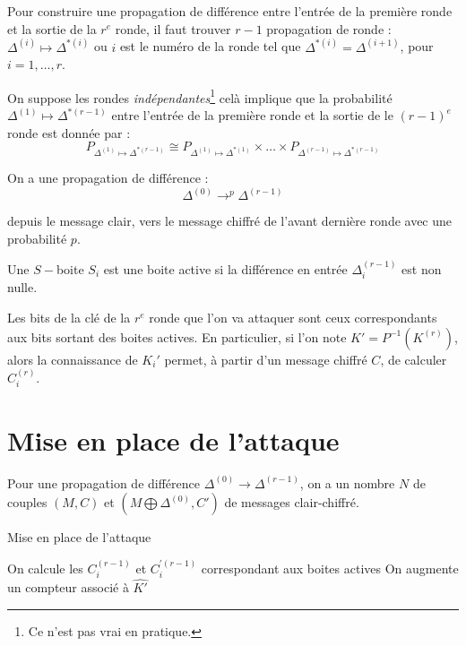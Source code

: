 \documentclass[a4paper, 10pt]{thesis}
\begin{document}
Pour construire une propagation de différence entre l'entrée de la première ronde et la sortie de la
$r^e$ ronde, il faut trouver $r-1$ propagation de ronde : $\Delta^{(i)} \mapsto \Delta^{*(i)}$ ou
$i$ est le numéro de la ronde tel que $\Delta^{*(i)} = \Delta^{(i+1)}$, pour $i = 1, \dots, r$.


On suppose les rondes \emph{indépendantes}\footnote{Ce n'est pas vrai en pratique.} celà implique
que la probabilité $\Delta^{(1)} \mapsto \Delta^{*(r-1)}$ entre l'entrée de la première ronde et la
sortie de le $(r - 1)^e$ ronde est donnée par : 
\begin{displaymath}
    P_{\Delta^{(1)} \mapsto \Delta^{*(r-1)}} \cong P_{\Delta^{(1)} \mapsto \Delta^{*(1)}} \times
    \dots \times P_{\Delta^{(r-1)} \mapsto \Delta^{*(r-1)}}
\end{displaymath}

On a une propagation de différence :
\begin{displaymath}
    \Delta^{(0)} \longrightarrow^{p} \Delta^{(r-1)}
\end{displaymath}

depuis le message clair, vers le message chiffré de l'avant dernière ronde avec une probabilité $p$.

\begin{df}
    Une $S-$boite $S_i$ est une boite active si la différence en entrée $\Delta_i^{(r-1)}$ est non
    nulle.
\end{df}

Les bits de la clé de la $r^e$ ronde que l'on va attaquer sont ceux correspondants aux bits sortant
des boites actives. En particulier, si l'on note $K' = P^{-1}(K^{(r)})$, alors la connaissance de
$K_i'$ permet, à partir d'un message chiffré $C$, de calculer $C_i^{(r)}$.

\section{Mise en place de l'attaque}

Pour une propagation de différence $\Delta^{(0)} \longrightarrow \Delta^{(r-1)}$, on a un nombre $N$
de couples $(M,C)$ et $(M \bigoplus \Delta^{(0)}, C')$ de messages clair-chiffré.

\begin{algorithm}
    \caption{Mise en place de l'attaque}
    \label{alg_att_diff}
    \begin{algorithmic}[1]
                \State On calcule les $C_i^{(r-1)}$ et $C_i^{'(r-1)}$ correspondant aux boites
                actives
                    \State On augmente un compteur associé à $\hat{K'}$
                \EndIf
            \EndFor
        \EndFor
    \end{algorithmic}
\end{algorithm}
\end{document}
